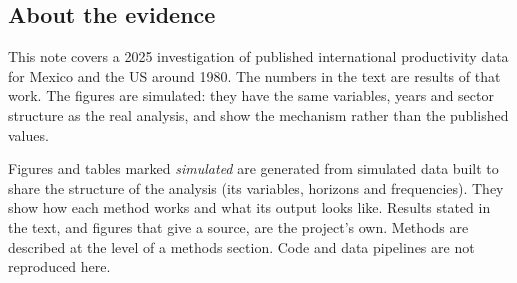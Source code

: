 \documentclass[
  british,
  a4paper,
]{article}
\begin{document}
\subsection{About the evidence}\label{about-the-evidence}

This note covers a 2025 investigation of published international
productivity data for Mexico and the US around 1980. The numbers in the
text are results of that work. The figures are simulated: they have the
same variables, years and sector structure as the real analysis, and
show the mechanism rather than the published values.

Figures and tables marked \emph{simulated} are generated from simulated
data built to share the structure of the analysis (its variables,
horizons and frequencies). They show how each method works and what its
output looks like. Results stated in the text, and figures that give a
source, are the project's own. Methods are described at the level of a
methods section. Code and data pipelines are not reproduced here.
\end{document}
